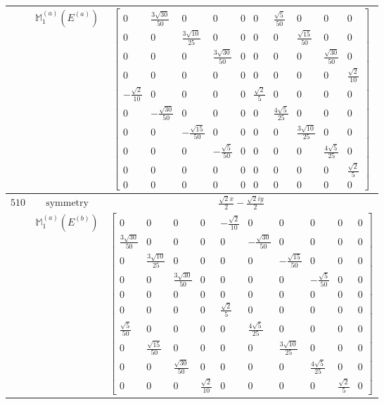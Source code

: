 \documentclass[fleqn,8pt,landscape]{jsarticle}
\begin{document}
\begin{longtable}{ccc}
$  $ & $ \mathbb{M}_{1}^{(a)}(E^{(a)}) $ & $ \begin{bmatrix} 0 & \frac{3 \sqrt{30}}{50} & 0 & 0 & 0 & 0 & \frac{\sqrt{5}}{50} & 0 & 0 & 0 \\ 0 & 0 & \frac{3 \sqrt{10}}{25} & 0 & 0 & 0 & 0 & \frac{\sqrt{15}}{50} & 0 & 0 \\ 0 & 0 & 0 & \frac{3 \sqrt{30}}{50} & 0 & 0 & 0 & 0 & \frac{\sqrt{30}}{50} & 0 \\ 0 & 0 & 0 & 0 & 0 & 0 & 0 & 0 & 0 & \frac{\sqrt{2}}{10} \\ - \frac{\sqrt{2}}{10} & 0 & 0 & 0 & 0 & \frac{\sqrt{2}}{5} & 0 & 0 & 0 & 0 \\ 0 & - \frac{\sqrt{30}}{50} & 0 & 0 & 0 & 0 & \frac{4 \sqrt{5}}{25} & 0 & 0 & 0 \\ 0 & 0 & - \frac{\sqrt{15}}{50} & 0 & 0 & 0 & 0 & \frac{3 \sqrt{10}}{25} & 0 & 0 \\ 0 & 0 & 0 & - \frac{\sqrt{5}}{50} & 0 & 0 & 0 & 0 & \frac{4 \sqrt{5}}{25} & 0 \\ 0 & 0 & 0 & 0 & 0 & 0 & 0 & 0 & 0 & \frac{\sqrt{2}}{5} \\ 0 & 0 & 0 & 0 & 0 & 0 & 0 & 0 & 0 & 0 \end{bmatrix} $ \\ \hline
$ 510 $ & $ \text{symmetry} $ & $ \frac{\sqrt{2} x}{2} - \frac{\sqrt{2} i y}{2} $ \\
$  $ & $ \mathbb{M}_{1}^{(a)}(E^{(b)}) $ & $ \begin{bmatrix} 0 & 0 & 0 & 0 & - \frac{\sqrt{2}}{10} & 0 & 0 & 0 & 0 & 0 \\ \frac{3 \sqrt{30}}{50} & 0 & 0 & 0 & 0 & - \frac{\sqrt{30}}{50} & 0 & 0 & 0 & 0 \\ 0 & \frac{3 \sqrt{10}}{25} & 0 & 0 & 0 & 0 & - \frac{\sqrt{15}}{50} & 0 & 0 & 0 \\ 0 & 0 & \frac{3 \sqrt{30}}{50} & 0 & 0 & 0 & 0 & - \frac{\sqrt{5}}{50} & 0 & 0 \\ 0 & 0 & 0 & 0 & 0 & 0 & 0 & 0 & 0 & 0 \\ 0 & 0 & 0 & 0 & \frac{\sqrt{2}}{5} & 0 & 0 & 0 & 0 & 0 \\ \frac{\sqrt{5}}{50} & 0 & 0 & 0 & 0 & \frac{4 \sqrt{5}}{25} & 0 & 0 & 0 & 0 \\ 0 & \frac{\sqrt{15}}{50} & 0 & 0 & 0 & 0 & \frac{3 \sqrt{10}}{25} & 0 & 0 & 0 \\ 0 & 0 & \frac{\sqrt{30}}{50} & 0 & 0 & 0 & 0 & \frac{4 \sqrt{5}}{25} & 0 & 0 \\ 0 & 0 & 0 & \frac{\sqrt{2}}{10} & 0 & 0 & 0 & 0 & \frac{\sqrt{2}}{5} & 0 \end{bmatrix} $ \\ \hline

\end{longtable}
\end{document}
